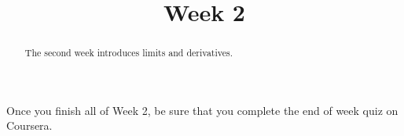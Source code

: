 \documentclass{ximera}
\title{Week 2}
\begin{document}
\begin{abstract}
  The second week introduces limits and derivatives.
\end{abstract}\maketitle


Once you finish all of Week 2, be sure that you complete the end of
week quiz on Coursera.
\end{document}
